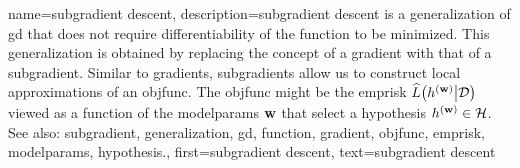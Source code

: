 {name={subgradient descent}, 
	description={\Gls{subgradient} 
		descent is a \gls{generalization} of \gls{gd} that does not require differentiability of the 
		\gls{function} to be minimized. This \gls{generalization} is obtained by replacing the concept 
		of a \gls{gradient} with that of a \gls{subgradient}. Similar to \glspl{gradient}, \glspl{subgradient} 
		allow us to construct local approximations of an \gls{objfunc}. The \gls{objfunc} 
		might be the \gls{emprisk} $\widehat{L}\big( h^{({\bf w})} \big| \mathcal{D} \big)$ viewed 
		as a \gls{function} of the \gls{modelparams} ${\bf w}$ that select a \gls{hypothesis} $h^{({\bf w})} \in \mathcal{H}$.
				\\
		See also: \gls{subgradient}, \gls{generalization}, \gls{gd}, \gls{function}, \gls{gradient}, \gls{objfunc}, \gls{emprisk}, \gls{modelparams}, \gls{hypothesis}.},
	first={subgradient descent},
	text={subgradient descent} 
}
	
